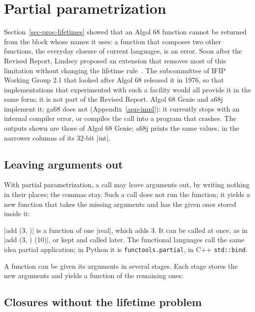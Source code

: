 \chapter{Partial parametrization}\label{app-partial}

Section~\ref{sec-proc-lifetimes} showed that an Algol 68 function cannot
be returned from the block whose names it uses: a function that composes
two other functions, the everyday closure of current languages, is an
error. Soon after the Revised Report, Lindsey proposed an extension that
removes most of this limitation without changing the lifetime
rule~\cite{partial}. The subcommittee of IFIP Working Group 2.1 that
looked after Algol 68 released it in 1976, so that implementations that
experimented with such a facility would all provide it in the same form;
it is not part of the Revised Report. Algol 68 Genie and a68j implement
it; ga68 does not (Appendix~\ref{app-impl}): it currently stops with an
internal compiler error, or compiles the call into a program that
crashes. The outputs shown are those of Algol 68 Genie;
a68j prints the same values, in the narrower columns of its 32-bit
\code|int|.

\section*{Leaving arguments out}

With partial parametrization, a call may leave arguments out, by writing
nothing in their places; the commas stay. Such a call does not run the function; it
yields a new function that takes the missing arguments and has the given
ones stored inside it:


\noindent \code|add (3, )| is a function of one \code|real|, which adds 3.
It can be called at once, as in \code|add (3, ) (10)|, or kept and called
later. The functional languages call the same idea partial application;
in Python it is \texttt{functools.partial}, in C++ \texttt{std::bind}.

A function can be given its arguments in several stages. Each stage
stores the new arguments and yields a function of the remaining ones:


\section*{Closures without the lifetime problem}

